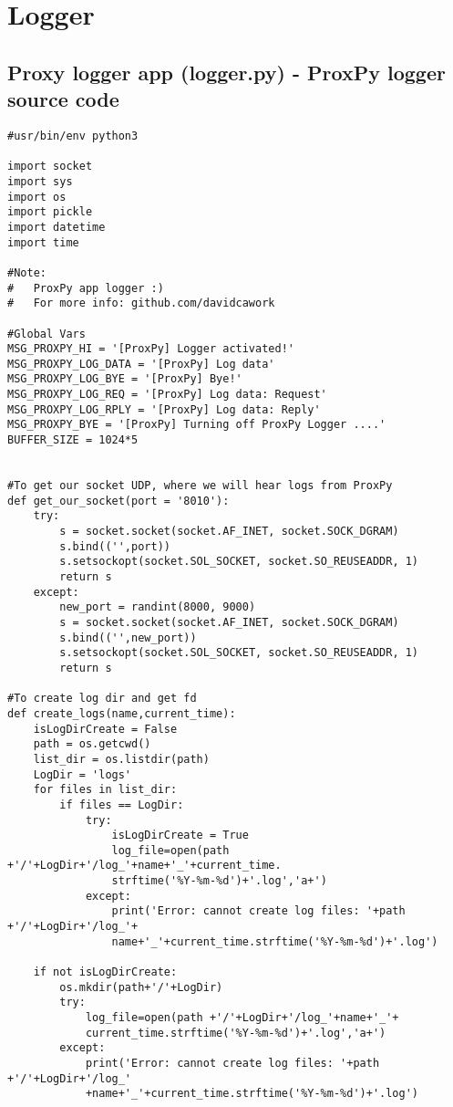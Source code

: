 \chapter{Logger}
\section{Proxy logger app (logger.py) - ProxPy logger source code}
\begin{verbatim}
#usr/bin/env python3

import socket
import sys
import os
import pickle
import datetime
import time 

#Note: 
#   ProxPy app logger :)
#   For more info: github.com/davidcawork

#Global Vars
MSG_PROXPY_HI = '[ProxPy] Logger activated!'
MSG_PROXPY_LOG_DATA = '[ProxPy] Log data'
MSG_PROXPY_LOG_BYE = '[ProxPy] Bye!'
MSG_PROXPY_LOG_REQ = '[ProxPy] Log data: Request'
MSG_PROXPY_LOG_RPLY = '[ProxPy] Log data: Reply'
MSG_PROXPY_BYE = '[ProxPy] Turning off ProxPy Logger ....'
BUFFER_SIZE = 1024*5


#To get our socket UDP, where we will hear logs from ProxPy
def get_our_socket(port = '8010'):
    try:
        s = socket.socket(socket.AF_INET, socket.SOCK_DGRAM)
        s.bind(('',port))
        s.setsockopt(socket.SOL_SOCKET, socket.SO_REUSEADDR, 1)
        return s
    except:
        new_port = randint(8000, 9000)
        s = socket.socket(socket.AF_INET, socket.SOCK_DGRAM)
        s.bind(('',new_port))
        s.setsockopt(socket.SOL_SOCKET, socket.SO_REUSEADDR, 1)
        return s

#To create log dir and get fd 
def create_logs(name,current_time):
    isLogDirCreate = False
    path = os.getcwd()
    list_dir = os.listdir(path)
    LogDir = 'logs'
    for files in list_dir:
        if files == LogDir:
            try:
                isLogDirCreate = True
                log_file=open(path +'/'+LogDir+'/log_'+name+'_'+current_time.
                strftime('%Y-%m-%d')+'.log','a+')
            except:
                print('Error: cannot create log files: '+path +'/'+LogDir+'/log_'+
                name+'_'+current_time.strftime('%Y-%m-%d')+'.log')
    
    if not isLogDirCreate:
        os.mkdir(path+'/'+LogDir)
        try:
            log_file=open(path +'/'+LogDir+'/log_'+name+'_'+
            current_time.strftime('%Y-%m-%d')+'.log','a+')
        except:
            print('Error: cannot create log files: '+path +'/'+LogDir+'/log_'
            +name+'_'+current_time.strftime('%Y-%m-%d')+'.log')
    

\end{verbatim}
